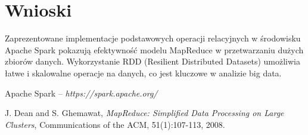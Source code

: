 \documentclass{article}
\begin{document}
\section{Wnioski}

Zaprezentowane implementacje podstawowych operacji relacyjnych w środowisku Apache Spark pokazują efektywność modelu MapReduce w przetwarzaniu dużych zbiorów danych. Wykorzystanie RDD (Resilient Distributed Datasets) umożliwia łatwe i skalowalne operacje na danych, co jest kluczowe w analizie big data.

\begin{thebibliography}{9}
Apache Spark --
\emph{https://spark.apache.org/}

J. Dean and S. Ghemawat,
\emph{MapReduce: Simplified Data Processing on Large Clusters},
Communications of the ACM, 51(1):107-113, 2008.

\end{thebibliography}
\end{document}
